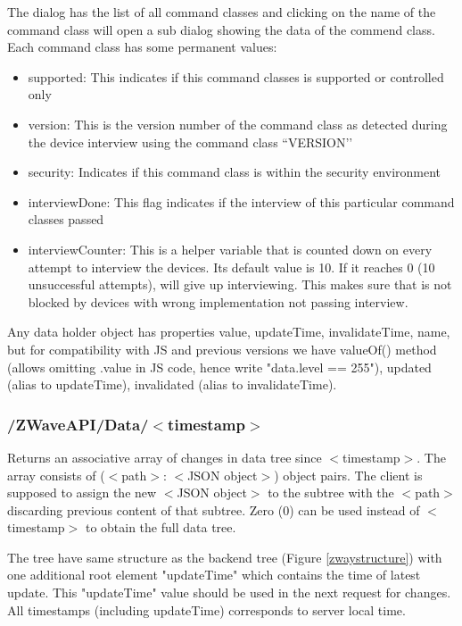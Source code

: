 The dialog has the list of all command classes and clicking on the name of the command 
class will open a sub dialog showing the data of the commend class. Each command class 
has some permanent values:

\begin {itemize}
\item supported: This indicates if this command classes is supported or controlled only
\item version: This is the version number of the command class as detected during the 
device interview using the command class ``VERSION’’
\item security: Indicates if this command class is within the security environment
\item interviewDone: This flag indicates if the interview of this particular command classes passed
\item interviewCounter: This is a helper variable that is counted down on every attempt to 
interview the devices. Its default value is 10. If it reaches 0 (10 unsuccessful attempts), 
\zway will give up interviewing. This makes sure that \zway is not blocked by devices 
with wrong implementation not passing interview.
\end{itemize}

Any data holder object has properties value, updateTime, invalidateTime, name, but for 
compatibility with JS and previous versions we have valueOf() method (allows 
omitting .value in JS code, hence write "data.level == 255"), updated (alias to updateTime), 
invalidated (alias to invalidateTime).


\subsubsection{/ZWaveAPI/Data/$<$timestamp$>$}

Returns an associative array of changes in \zway data tree since $<$timestamp$>$. The array 
consists of ($<$path$>$: $<$JSON object$>$) object pairs. The client is supposed to assign 
the new $<$JSON object$>$ to the subtree with the $<$path$>$ discarding previous content 
of that subtree. Zero (0) can be used instead of $<$timestamp$>$ to obtain the full \zway 
data tree.

The tree have same structure as the backend tree (Figure \ref{zwaystructure}) with one 
additional root element "updateTime" which contains the time of latest update. This 
"updateTime" value should be used in the next request for changes. All timestamps 
(including updateTime) corresponds to server local time.

